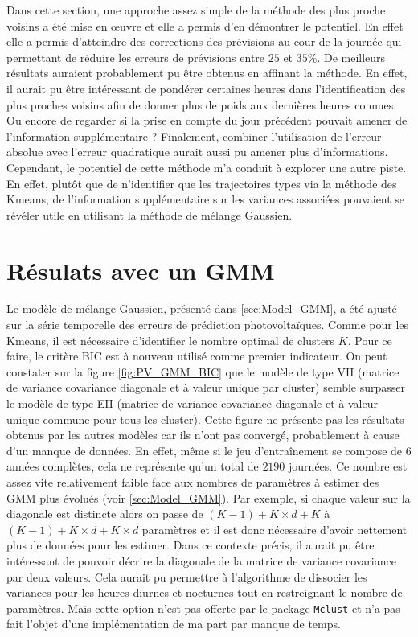 \documentclass[12pt]{report}
\begin{document}
Dans cette section, une approche assez simple de la méthode des plus proche voisins a été mise en œuvre et elle a permis d'en démontrer le potentiel. En effet elle a permis d'atteindre des corrections des prévisions au cour de la journée qui permettant de réduire les erreurs de prévisions entre $25$ et $35\%$. De meilleurs résultats auraient probablement pu être obtenus en affinant la méthode. En effet, il aurait pu être intéressant de pondérer certaines heures dans l'identification des plus proches voisins afin de donner plus de poids aux dernières heures connues. Ou encore de regarder si la prise en compte du jour précédent pouvait amener de l'information supplémentaire ? Finalement, combiner l'utilisation de l'erreur absolue avec l'erreur quadratique aurait aussi pu amener plus d'informations. Cependant, le potentiel de cette méthode m'a conduit à explorer une autre piste. En effet, plutôt que de n'identifier que les trajectoires types via la méthode des Kmeans, de l'information supplémentaire sur les variances associées pouvaient se révéler utile en utilisant la méthode de mélange Gaussien.


\section{Résulats avec un GMM}
\label{sec:PV_GMM}

Le modèle de mélange Gaussien, présenté dans \ref{sec:Model_GMM}, a été ajusté sur la série temporelle des erreurs de prédiction photovoltaïques. Comme pour les Kmeans, il est nécessaire d'identifier le nombre optimal de clusters $K$. Pour ce faire, le critère BIC est à nouveau utilisé comme premier indicateur. On peut constater sur la figure \ref{fig:PV_GMM_BIC} que le modèle de type VII (matrice de variance covariance diagonale et à valeur unique par cluster) semble surpasser le modèle de type EII (matrice de variance covariance diagonale et à valeur unique commune pour tous les cluster). Cette figure ne présente pas les résultats obtenus par les autres modèles car ils n'ont pas convergé, probablement à cause d'un manque de données. En effet, même si le jeu d'entraînement se compose de 6 années complètes, cela ne représente qu'un total de $2190$ journées. Ce nombre est assez vite relativement faible face aux nombres de paramètres à estimer des GMM plus évolués (voir \ref{sec:Model_GMM}). Par exemple, si chaque valeur sur la diagonale est distincte alors on passe de $(K-1) + K\times d + K$ à $(K-1) + K\times d + K \times d$ paramètres et il est donc nécessaire d'avoir nettement plus de données pour les estimer. Dans ce contexte précis, il aurait pu être intéressant de pouvoir décrire la diagonale de la matrice de variance covariance par deux valeurs. Cela aurait pu permettre à l'algorithme de dissocier les variances pour les heures diurnes et nocturnes tout en restreignant le nombre de paramètres. Mais cette option n'est pas offerte par le package \texttt{Mclust} et n'a pas fait l'objet d'une implémentation de ma part par manque de temps.
\end{document}

